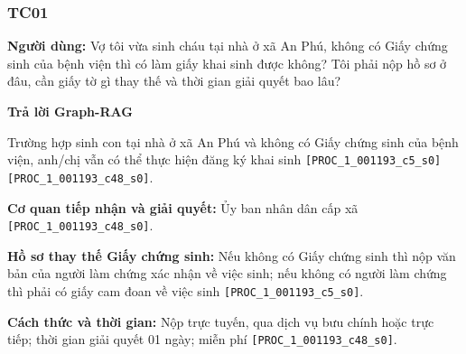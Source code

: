\documentclass[11pt,a4paper]{article}
\newcommand{\src}[1]{\texttt{#1}}
\begin{document}
\subsubsection*{TC01}
\begin{questionbox}
\textbf{Người dùng:} Vợ tôi vừa sinh cháu tại nhà ở xã An Phú, không có Giấy chứng sinh của bệnh viện thì có làm giấy khai sinh được không? Tôi phải nộp hồ sơ ở đâu, cần giấy tờ gì thay thế và thời gian giải quyết bao lâu?
\end{questionbox}

\textbf{Trả lời Graph-RAG}\par\nobreak
\begin{answerbox}
Trường hợp sinh con tại nhà ở xã An Phú và không có Giấy chứng sinh của bệnh viện, anh/chị vẫn có thể thực hiện đăng ký khai sinh \src{[PROC\_1\_001193\_c5\_s0][PROC\_1\_001193\_c48\_s0]}.

\textbf{Cơ quan tiếp nhận và giải quyết:} Ủy ban nhân dân cấp xã \src{[PROC\_1\_001193\_c48\_s0]}.

\textbf{Hồ sơ thay thế Giấy chứng sinh:} Nếu không có Giấy chứng sinh thì nộp văn bản của người làm chứng xác nhận về việc sinh; nếu không có người làm chứng thì phải có giấy cam đoan về việc sinh \src{[PROC\_1\_001193\_c5\_s0]}.

\textbf{Cách thức và thời gian:} Nộp trực tuyến, qua dịch vụ bưu chính hoặc trực tiếp; thời gian giải quyết 01 ngày; miễn phí \src{[PROC\_1\_001193\_c48\_s0]}.
\end{answerbox}
\end{document}
